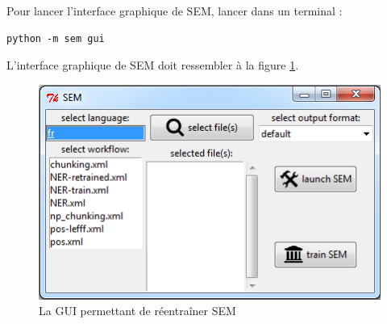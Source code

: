 \documentclass[manual-fr.tex]{subfiles}
\begin{document}
Pour lancer l'interface graphique de SEM, lancer dans un terminal :

\begin{lstlisting}[style=pieceofcode,frame=single]
python -m sem gui
\end{lstlisting}

L'interface graphique de SEM doit ressembler à la figure \ref{fig:train_sem-01}.

\begin{figure}[ht!]
    \begin{center}
    \includegraphics[scale=0.4]{fr/images/train_sem-01.png}
    \end{center}
    \caption{La GUI permettant de réentraîner SEM}
    \label{fig:train_sem-01}
\end{figure}
\end{document}
